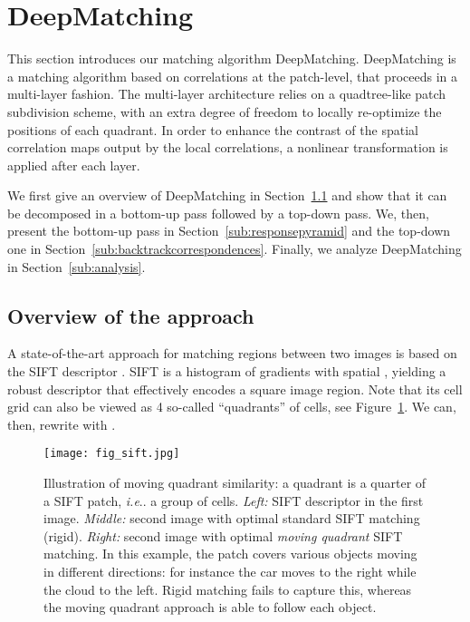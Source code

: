 \documentclass[twocolumn,natbib]{svjour3}
\makeatletter
\DeclareRobustCommand\onedot{\futurelet\@let@token\@onedot}
\def\@onedot{\ifx\@let@token.\else.\null\fi\xspace}
\def\ie{\emph{i.e}\onedot} \def\Ie{\emph{I.e}\onedot}
\newcommand{\red}[1]{{\color{black}{#1}}}
\makeatother
\begin{document}
 \section{DeepMatching}
\label{sec:dm}

This section introduces our matching algorithm DeepMatching.
DeepMatching is a matching algorithm based on correlations at the patch-level,  
that proceeds in a multi-layer fashion. 
The multi-layer architecture relies on a quadtree-like patch subdivision scheme, 
with an extra degree of freedom to locally re-optimize the positions of each quadrant. 
In order to enhance the contrast of the spatial correlation maps output by the local correlations, 
a nonlinear transformation is applied after each layer.


We first give an overview of DeepMatching in Section~\ref{sub:insight}
and show that it can be decomposed in a bottom-up pass followed by a top-down pass. 
We, then,  present the bottom-up pass in Section~\ref{sub:responsepyramid} and the top-down one in Section~\ref{sub:backtrackcorrespondences}.  
Finally, we analyze DeepMatching in Section~\ref{sub:analysis}.


\subsection{Overview of the approach}
\label{sub:insight} 

\def\R{\mathbf{R}}

A state-of-the-art approach for matching regions between two images is based on the SIFT descriptor \citep{Lowe2004}. 
SIFT is a histogram of gradients with  spatial
\red{and  orientation bins}, yielding a robust descriptor  that
effectively encodes a square image region.  
Note that its  cell grid can also be viewed as 4 so-called ``quadrants'' of  cells, see Figure~\ref{fig:sift}. 
We can, then, rewrite  with . 

\begin{figure}
  \centering
  \texttt{[image: fig\_sift.jpg]}
  \caption{Illustration of moving quadrant similarity: a quadrant is a quarter of a SIFT patch, \ie a group of  cells.
    \emph{Left:} SIFT descriptor in the first image.
    \emph{Middle:} second image with optimal standard SIFT matching (rigid).
    \emph{Right:} second image with optimal \emph{moving quadrant} SIFT matching.
    In this example, the patch covers various objects moving in different directions: for instance
    the car moves to the right while the cloud to the left. Rigid
    matching fails to capture this, whereas the moving quadrant approach is able to follow each object.}
  \label{fig:sift}
\end{figure}
\end{document}
